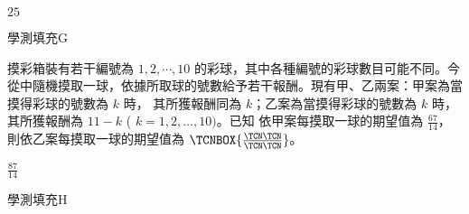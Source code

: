 \begin{QUESTIONS}
\begin{QUESTION}
\begin{QBODY}
        \end{QBODY}
        \begin{QFROMS}
        \end{QFROMS}
        \begin{QTAGS}\end{QTAGS}
        \begin{QANS}
            $25$
        \end{QANS}
        \begin{QSOLLIST}
        \end{QSOLLIST}
        \begin{QEMPTYSPACE}
        \end{QEMPTYSPACE}
    \end{QUESTION}
    \begin{QUESTION}
        \begin{ExamInfo}{96}{學測}{填充}{G}
        \end{ExamInfo}
        \begin{ExamAnsRateInfo}{19}{39}{13}{5}
        \end{ExamAnsRateInfo}
        \begin{QBODY}
            摸彩箱裝有若干編號為 $1, 2, \cdots ,10$ 的彩球，其中各種編號的彩球數目可能不同。今從中隨機摸取一球，依據所取球的號數給予若干報酬。現有甲、乙兩案：甲案為當摸得彩球的號數為 $k$ 時， 其所獲報酬同為 $k$；乙案為當摸得彩球的號數為 $k$ 時，其所獲報酬為 $11- k$ ( $k = 1, 2, \dots ,10 )$。已知
依甲案每摸取一球的期望值為 $\frac{67}{14}$，則依乙案每摸取一球的期望值為 
$\TCNBOX{\frac{\TCN\TCN}{\TCN\TCN}}$。
        \end{QBODY}
        \begin{QFROMS}
        \end{QFROMS}
        \begin{QTAGS}\end{QTAGS}
        \begin{QANS}
            $\frac{87}{14}$
        \end{QANS}
        \begin{QSOLLIST}
        \end{QSOLLIST}
        \begin{QEMPTYSPACE}
        \end{QEMPTYSPACE}
    \end{QUESTION}
    \begin{QUESTION}
        \begin{ExamInfo}{96}{學測}{填充}{H}
        \end{ExamInfo}

\end{QUESTION}
\end{QUESTIONS}
